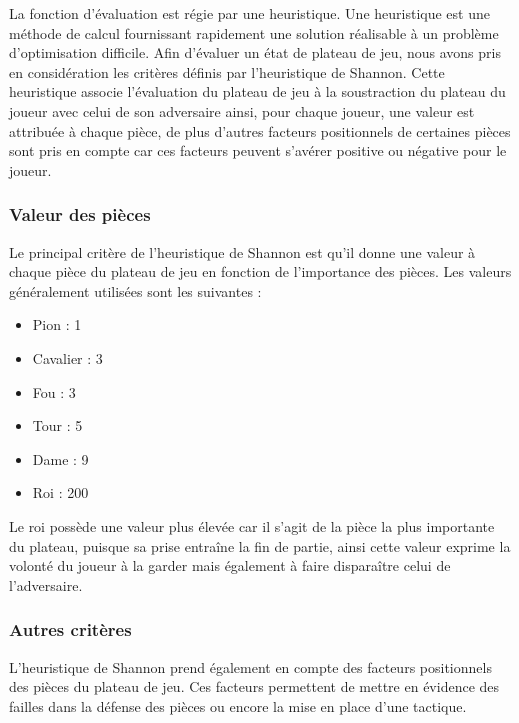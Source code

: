 \huge\documentclass{article}
\begin{document}
    La fonction d'évaluation est régie par une heuristique.
    Une heuristique est une méthode de calcul fournissant rapidement une solution réalisable à un problème d'optimisation difficile.
    \newline
    Afin d'évaluer un état de plateau de jeu, nous avons pris en considération les critères définis par l'heuristique de Shannon\cite{Shannon_Heuristic}. Cette heuristique associe l'évaluation du plateau de jeu à la soustraction du plateau du joueur avec celui de son adversaire ainsi, pour chaque joueur, une valeur est attribuée à chaque pièce, de plus d'autres facteurs positionnels de certaines pièces sont pris en compte car ces facteurs peuvent s'avérer positive ou négative pour le joueur.
    \subsubsection{Valeur des pièces}
    Le principal critère de l'heuristique de Shannon est qu'il donne une valeur à chaque pièce du plateau de jeu en fonction de l'importance des pièces.
    \newline
    Les valeurs généralement utilisées sont les suivantes :
    \begin{itemize}
        \item Pion : 1
        \item Cavalier : 3
        \item Fou : 3
        \item Tour : 5
        \item Dame : 9
        \item Roi : 200
    \end{itemize}
    Le roi possède une valeur plus élevée car il s'agit de la pièce la plus importante du plateau, puisque sa prise entraîne la fin de partie, ainsi cette valeur exprime la volonté du joueur à la garder mais également à faire disparaître celui de l'adversaire.

    \subsubsection{Autres critères}
    L'heuristique de Shannon prend également en compte des facteurs positionnels des pièces du plateau de jeu. Ces facteurs permettent de mettre en évidence des failles dans la défense des pièces ou encore la mise en place d'une tactique.
    \newline
\end{document}
